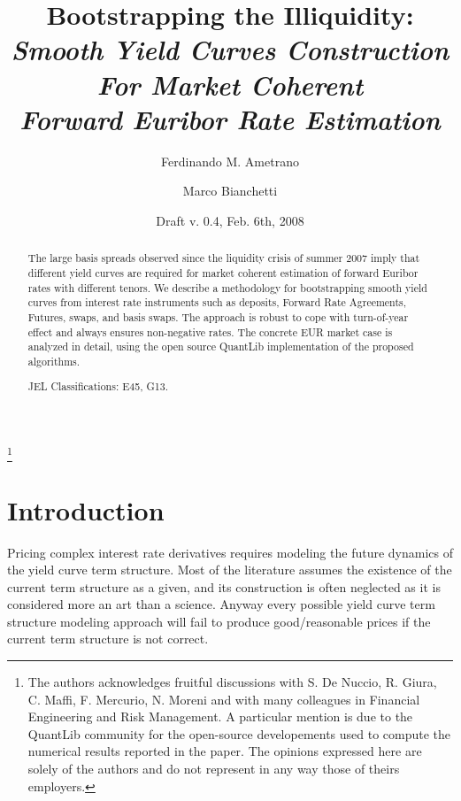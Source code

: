 \documentclass[11pt,reqno]{amsart}
\begin{document}
\title[Smooth Yield Curves For Euribor Estimation]{Bootstrapping the Illiquidity: \\ \emph{Smooth Yield Curves Construction \\
For Market Coherent \\
Forward Euribor Rate Estimation}}

\author{Ferdinando M. Ametrano}
\address{Financial Engineering, Banca IMI, Piazzetta G. Dell'Amore 3, 20121
Milan Italy, ferdinando.ametrano@bancaimi.com}
\author{Marco Bianchetti}
\address{Risk Management, Banca IntesaSanpaolo, Piazza G. Ferrari 10, 20121
Milan Italy, marco.bianchetti@intesasanpaolo.com}

\thanks{The authors acknowledges fruitful discussions with S. De Nuccio, R. Giura, C. Maffi, F. Mercurio, N. Moreni and with many colleagues in Financial Engineering and Risk Management. A particular mention is due to the QuantLib community for the open-source developements used to compute the numerical results reported in the paper. The opinions expressed here are solely of the authors and do not represent in any way those of theirs employers.}

\date{Draft v. 0.4, Feb. 6th, 2008}

\begin{abstract}
The large basis spreads observed since the liquidity crisis of summer 2007 imply that different yield curves are required for market coherent estimation of forward Euribor rates with different tenors. We describe a methodology for bootstrapping smooth yield curves from interest rate instruments such as deposits, Forward Rate Agreements, Futures, swaps, and basis swaps. The approach is robust to cope with turn-of-year effect and always ensures non-negative rates. The concrete EUR market case is analyzed in detail, using the open source QuantLib implementation of the proposed algorithms.

JEL Classifications: E45, G13.

\end{abstract}

\maketitle

\section{Introduction}

Pricing complex interest rate derivatives requires modeling the future
dynamics of the yield curve term structure. Most of the literature assumes
the existence of the current term structure as a given, and its construction
is often neglected as it is considered more an art than a science. Anyway
every possible yield curve term structure modeling approach will fail to
produce good/reasonable prices if the current term structure is not correct.
\end{document}
